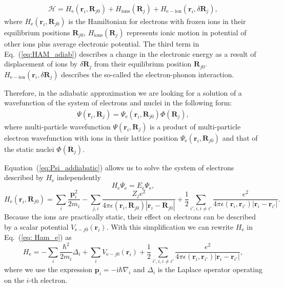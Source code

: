 \begin{eqnarray}
\mathcal{H}=H_\mathrm{e}\left(\mathbf{r}_i,\mathbf{R}_{j0}\right)+H_{\mathrm{ions}}\left(\mathbf{R}_j\right)+H_{\mathrm{e-ion}}\left(\mathbf{r}_i,\delta\mathbf{R}_{j}\right),\label{eq:HAM_adiab}
\end{eqnarray}
%
where $H_\mathrm{e}\left(\mathbf{r}_i,\mathbf{R}_{j0}\right)$ is the Hamiltonian for electrons with frozen ions in their equilibrium positions $\mathbf{R}_{j0}$, $H_{\mathrm{ions}}\left(\mathbf{R}_j\right)$ represents ionic motion in potential of other ions plus average electronic potential. The third term in Eq.~(\ref{eq:HAM_adiab}) describes a change in the electronic energy as a result of displacement of ions by $\delta\mathbf{R}_{j}$ from their equilibrium position $\mathbf{R}_{j0}$. $H_{\mathrm{e-ion}}\left(\mathbf{r}_i,\delta\mathbf{R}_{j}\right)$ describes the so-called the electron-phonon interaction.

Therefore, in the adiabatic approximation we are looking for a solution of a wavefunction of the system of electrons and nuclei in the following form:
%
\begin{eqnarray}
\Psi\left(\mathbf{r}_i, \mathbf{R}_{j}\right)=\Psi_\mathrm{e}\left(\mathbf{r}_i,\mathbf{R}_{j0}\right)\Phi\left(\mathbf{R}_j\right),\label{eq:Psi_addiabatic}
\end{eqnarray}
%
where multi-particle wavefunction $\Psi\left(\mathbf{r}_i, \mathbf{R}_{j}\right)$ is a product of multi-particle electron wavefunction with ions in their lattice position $\Psi_\mathrm{e}\left(\mathbf{r}_i,\mathbf{R}_{j0}\right)$ and that of the static nuclei $\Phi\left(\mathbf{R}_j\right)$.

Equation~(\ref{eq:Psi_addiabatic}) allows us to solve the system of electrons described by $H_\mathrm{e}$ independently
\begin{equation}
H_\mathrm{e}\Psi_\mathrm{e}=E_\mathrm{e}\Psi_\mathrm{e},
\end{equation}
\begin{equation}
H_\mathrm{e}\left(\mathbf{r}_i,\mathbf{R}_{j0}\right)=\sum_{i} \frac{\mathbf{p}_i^2}{2m_i}- \sum_{j, i} \frac{Z_j e^2}{4\pi \epsilon(\mathbf{r}_i, \mathbf{R}_{j0}) |\mathbf{r}_i-\mathbf{R}_{j0}|} + \frac{1}{2}\sum_{i', i, i\neq i'} \frac{e^2}{4\pi \epsilon(\mathbf{r}_i, \mathbf{r}_{i'})  |\mathbf{r}_i-\mathbf{r}_{i'}|} .\label{eq: Ham_e}
\end{equation}
%
Because the ions are practically static, their effect on electrons can be described by a scalar potential $V_{\mathrm{e}-j0}\left(\mathbf{r}_i\right)$. With this simplification we can rewrite $H_\mathrm{e}$ in Eq.~(\ref{eq: Ham_e}) as
\begin{equation}
H_\mathrm{e}=-\sum_{i} \frac{\hbar^2}{2m_i}\Delta_i+\sum_i V_{\mathrm{e}-j0}\left(\mathbf{r}_i\right) + \frac{1}{2}\sum_{i', i, i\neq i'} \frac{e^2}{4\pi \epsilon(\mathbf{r}_i, \mathbf{r}_{i'})  |\mathbf{r}_i-\mathbf{r}_{i'}|},\label{eq: Ham_e2}
\end{equation}
where we use the expression $\mathbf{p}_i=-\mathrm{i}\hbar\nabla_i$ and $\Delta_i$ is the Laplace operator operating on the $i$-th electron.



